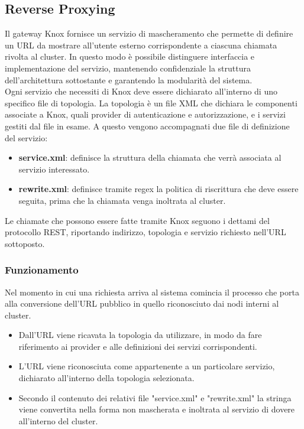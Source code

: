 \subsection{Reverse Proxying}
Il gateway Knox fornisce un servizio di mascheramento che permette di definire un URL da mostrare all'utente esterno corrispondente a ciascuna chiamata rivolta al cluster. In questo modo è possibile distinguere interfaccia e implementazione del servizio, mantenendo confidenziale la struttura dell'architettura sottostante e garantendo la modularità del sistema.\\
Ogni servizio che necessiti di Knox deve essere dichiarato all'interno di uno specifico file di topologia. La topologia è un file XML che dichiara le componenti associate a Knox, quali provider di autenticazione e autorizzazione, e i servizi gestiti dal file in esame.
A questo vengono accompagnati due file di definizione del servizio:
\begin{itemize}
	\item \textbf{service.xml}: definisce la struttura della chiamata che verrà associata al servizio interessato.
	\item \textbf{rewrite.xml}: definisce tramite regex la politica di riscrittura che deve essere seguita, prima che la chiamata venga inoltrata al cluster.
\end{itemize}
Le chiamate che possono essere fatte tramite Knox seguono i dettami del protocollo REST, riportando indirizzo, topologia e servizio richiesto nell'URL sottoposto.

\subsubsection{Funzionamento}
Nel momento in cui una richiesta arriva al sistema comincia il processo che porta alla conversione dell'URL pubblico in quello riconosciuto dai nodi interni al cluster.
\begin{itemize}
	\item Dall'URL viene ricavata la topologia da utilizzare, in modo da fare riferimento ai provider e alle definizioni dei servizi corrispondenti.
	\item L'URL viene riconosciuta come appartenente a un particolare servizio, dichiarato all'interno della topologia selezionata.
	\item Secondo il contenuto dei relativi file "service.xml" e "rewrite.xml" la stringa viene convertita nella forma non mascherata e inoltrata al servizio di dovere all'interno del cluster. 
\end{itemize}

